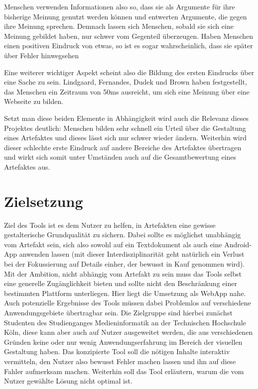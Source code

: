 Menschen verwenden Informationen also so, dass sie als Argumente für ihre bisherige Meinung genutzt werden können und entwerten Argumente, die gegen ihre Meinung sprechen. Demnach lassen sich Menschen, sobald sie sich eine Meinung gebildet haben, nur schwer vom Gegenteil überzeugen.
Haben Menschen einen positiven Eindruck von etwas, so ist es sogar wahrscheinlich, dass sie später über Fehler hinwegsehen \cite{campbell1996fitting}

Eine weiterer wichtiger Aspekt scheint also die Bildung des ersten Eindrucks über eine Sache zu sein. Lindgaard, Fernandes, Dudek und Brown haben festgestellt, das Menschen ein Zeitraum von 50ms ausreicht, um sich eine Meinung über eine Webseite zu bilden. \cite{lindgaard2006attention}

Setzt man diese beiden Elemente in Abhängigkeit wird auch die Relevanz dieses Projektes deutlich: Menschen bilden sehr schnell ein Urteil über die Gestaltung eines Artefaktes und dieses lässt sich nur schwer wieder ändern. Weiterhin wird dieser schlechte erste Eindruck auf andere Bereiche des Artefaktes übertragen und wirkt sich somit unter Umständen auch auf die Gesamtbewertung eines Artefaktes aus.


\section{Zielsetzung}
Ziel des Tools ist es dem Nutzer zu helfen,  in Artefakten eine gewisse gestalterische Grundqualität zu sichern. Dabei sollte es möglichst unabhängig vom Artefakt sein, sich also sowohl auf ein Textdokument als auch eine Android-App anwenden lassen (mit dieser Interdisziplinarität geht natürlich ein Verlust bei der Fokussierung auf Details einher, der bewusst in Kauf genommen wird).
Mit der Ambition, nicht abhängig vom Artefakt zu sein muss das Tools selbst eine generelle Zugänglichkeit bieten und sollte nicht den Beschränkung einer bestimmten Plattform unterliegen. Hier liegt die Umsetzung als WebApp nahe. Auch potenzielle Ergebnisse des Tools müssen dabei Problemlos auf verschiedene Anwendungsgebiete übertragbar sein.
Die Zielgruppe sind hierbei zunächst Studenten des Studienganges Medieninformatik an der Technischen Hochschule Köln, diese kann aber auch auf Nutzer ausgeweitet werden, die aus verschiedenen Gründen keine oder nur wenig Anwendungserfahrung im Bereich der visuellen Gestaltung haben.
Das konzipierte Tool soll die nötigen Inhalte interaktiv vermitteln, den Nutzer also bewusst Fehler machen lassen und ihn auf diese Fahler aufmerksam machen. Weiterhin soll das Tool erläutern, warum die vom Nutzer gewählte Lösung nicht optimal ist.

